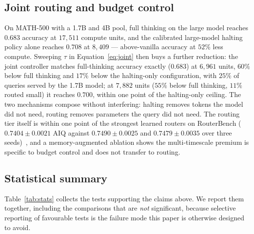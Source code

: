 \documentclass[acmsmall]{acmart}
\theoremstyle{acmdefinition}%
\theoremstyle{acmplain}}{}%
\begin{document}
\subsection{Joint routing and budget control}
On MATH-500 with a 1.7B and 4B pool, full thinking on the large model reaches $0.683$ accuracy at $17{,}511$ compute units, and the calibrated large-model halting policy alone reaches $0.708$ at $8{,}409$ --- above-vanilla accuracy at $52\%$ less compute. Sweeping $\tau$ in Equation~\eqref{eq:joint} then buys a further reduction: the joint controller matches full-thinking accuracy exactly ($0.683$) at $6{,}961$ units, $60\%$ below full thinking and $17\%$ below the halting-only configuration, with $25\%$ of queries served by the 1.7B model; at $7{,}882$ units ($55\%$ below full thinking, $11\%$ routed small) it reaches $0.700$, within one point of the halting-only ceiling. The two mechanisms compose without interfering: halting removes tokens the model did not need, routing removes parameters the query did not need. The routing tier itself is within one point of the strongest learned routers on RouterBench ($0.7404 \pm 0.0021$ AIQ against $0.7490 \pm 0.0025$ and $0.7479 \pm 0.0035$ over three seeds)~\cite{hu2024routerbench,ong2024routellm}, and a memory-augmented ablation shows the multi-timescale premium is specific to budget control and does not transfer to routing.

\subsection{Statistical summary}
Table~\ref{tab:stats} collects the tests supporting the claims above. We report them together, including the comparisons that are \emph{not} significant, because selective reporting of favourable tests is the failure mode this paper is otherwise designed to avoid.
\end{document}
